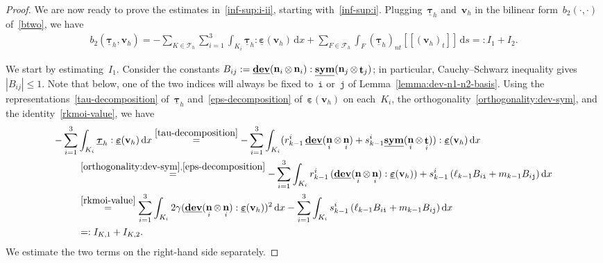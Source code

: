 \documentclass[a4paper,twoside,10pt]{article}
\theoremstyle{plain}
\theoremstyle{remark}
\theoremstyle{definition}
\numberwithin{equation}{section}
\numberwithin{figure}{section}
\newcommand{\jump}[1]{\left[\!\left[#1\right]\!\right]}
\newcommand{\Tauh}{\mathcal{T}_h}
\newcommand{\K}{K}
\newcommand{\F}{F}
\newcommand{\taubfh}{\underline{\boldsymbol{\tau}}_h}
\newcommand{\vbfh}{\mathbf{v}_h}
\DeclareMathOperator{\dev}{\underline{\mathbf{dev}}}
\newcommand{\normtang}{{nt}}
\newcommand{\sym}{\underline{\bf{sym}}}
\DeclareMathOperator{\norm}{\bf{n}}
\DeclareMathOperator{\tang}{\bf{t}}
\newcommand{\tangscalar}{t}
\newcommand{\Fcalh}{\mathcal{F}_h}
\newcommand{\dx}{\, \mathrm{d}x}
\newcommand{\ds}{\, \mathrm{d}s}
\newcommand{\btwo}{b_2}
\newcommand{\epsbfun}{\underline{\boldsymbol{\varepsilon}}}
\newcommand{\rkmoi}{r_{k-1}^i}
\newcommand{\skmoi}{s_{k-1}^i}
\newcommand{\lkmo}{\ell_{k-1}}
\newcommand{\mkmo}{m_{k-1}}
\newcommand{\Ki}{{\K_i}}
\newcommand{\itt}{\mathtt{i}}
\newcommand{\jtt}{\mathtt{j}}
\newcommand{\normi}{\norm_i}
\newcommand{\tangi}{\tang_i}
\newcommand{\normj}{\norm_j}
\newcommand{\tangj}{\tang_j}
\newcommand{\Ione}{I_1}
\newcommand{\Itwo}{I_2}
\newcommand{\IKone}{I_{\K,1}}
\newcommand{\IKtwo}{I_{\K,2}}
\begin{document}
\begin{proof}
We are now ready to prove the estimates in~\eqref{inf-sup:i-ii},
starting with~\eqref{inf-sup:i}.
Plugging~$\taubfh$ and~$\vbfh$
in the bilinear form~$\btwo(\cdot,\cdot)$ of~\eqref{btwo},
we have
\begin{equation*} \label{bt-Ione-Itwo}
\begin{split}
\btwo(\taubfh,\vbfh) 
= -\sum_{\K \in \Tauh} \sum_{i=1}^3 \int_{\Ki} \taubfh : \epsbfun(\vbfh) \dx
    + \sum_{\F \in \Fcalh} \int_{\F} (\taubfh)_{\normtang}\jump{(\vbfh)_{\tangscalar}} \ds 
=: \Ione + \Itwo.
\end{split}
\end{equation*}

We start by estimating~$\Ione$.
Consider the constants
$B_{ij} := \dev(\normi\otimes\normi):\sym(\normj\otimes\tangj)$;
in particular,
Cauchy--Schwarz inequality gives~$|B_{ij}| \leq 1$.
Note that below,
one of the two indices will always be fixed to~$\itt$ or~$\jtt$
of Lemma~\ref{lemma:dev-n1-n2-basis}.
Using the representations~\eqref{tau-decomposition} of~$\taubfh$
and~\eqref{eps-decomposition} of~$\epsbfun(\vbfh)$  on each~$\Ki$,
the orthogonality~\eqref{orthogonality:dev-sym},
and the identity~\eqref{rkmoi-value},
we have
\begin{equation} \label{Ione}
\begin{split}
-\sum_{i=1}^3& \int_{\Ki} \taubfh : \epsbfun(\vbfh) \dx 
\overset{\eqref{tau-decomposition}}{=}
-\sum_{i=1}^3 \int_{\Ki} (\rkmoi\dev(\normi\otimes\normi)+\skmoi\sym(\normi\otimes\tangi)) : \epsbfun(\vbfh) \dx \\
&\overset{\eqref{orthogonality:dev-sym},\eqref{eps-decomposition}}{=} 
-\sum_{i=1}^3 \int_{\Ki} 
   \rkmoi\,(\dev(\normi\otimes\normi):\epsbfun(\vbfh))
   + \skmoi\,(\lkmo B_{i\itt} + \mkmo B_{i\jtt}) \dx \\
&\overset{\eqref{rkmoi-value}}{=}
\sum_{i=1}^3 \int_{\Ki} 
   2\gamma(\dev(\normi\otimes\normi):\epsbfun(\vbfh))^2 
   \dx
   -\sum_{i=1}^3 \int_{\Ki} \skmoi\,(\lkmo B_{i\itt} + \mkmo B_{i\jtt}) \dx\\
&=: {\IKone} + {\IKtwo}.
\end{split}
\end{equation}
We estimate the two terms on the right-hand side separately.


\end{proof}
\end{document}
